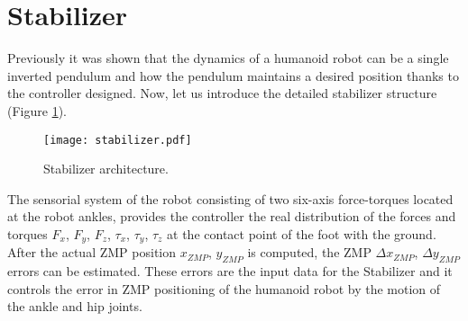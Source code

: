 \section{Stabilizer}
Previously it was shown that the dynamics of a humanoid robot can be a single inverted pendulum and how the pendulum maintains a desired position thanks to the controller designed. Now, let us introduce the detailed stabilizer structure (Figure \ref{fig:stabilizer}).

\begin{figure}[!h]
\centering
\texttt{[image: stabilizer.pdf]}
\caption{Stabilizer architecture.}
\label{fig:stabilizer}
\end{figure}

The sensorial system of the robot consisting of two six-axis force-torques located at the robot ankles, provides the controller the real distribution of the forces and torques $F_x$, $F_y$, $F_z$, $\tau_x$, $\tau_y$, $\tau_z$ at the contact point of the foot with the ground. After the actual ZMP position $x_{ZMP}$, $y_{ZMP}$ is computed, the ZMP $\Delta x_{ZMP}$, $\Delta y_{ZMP}$ errors can be estimated. These errors are the input data for the Stabilizer and it controls the error in ZMP positioning of the humanoid robot by the motion of the ankle and hip joints.

